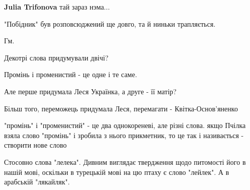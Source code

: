 \begin{itemize}
\begin{itemize}
\textbf{Julia Trifonova} тай зараз нэма...

 
"Побідник" був розповсюджений ще довго, та й ниньки трапляється.

\end{itemize}

 

Гм.

Декотрі слова придумували двічі?

Промінь і променистий - це одне і те саме.

Але перше придумала Леся Українка, а друге - її матір?

\begin{itemize}
 
Більш того, переможець придумала Леся, перемагати - Квітка-Основ’яненко

 

"промінь" і "променистий" - це два однокореневі, але різні слова. якщо Пчілка
взяла слово "промінь" і зробила з нього прикметник, то це так і називається -
створити нове слово

\end{itemize}

 

Стосовно слова "лелека". Дивним виглядає твердження щодо питомості його в нашій
мові, оскільки в турецькій мові на цю птаху є слово "лейлек". А в арабській
"лякайляк".


\end{itemize}
